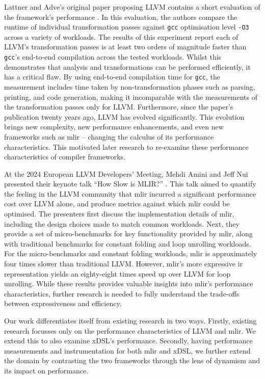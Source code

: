 Lattner and Adve's original paper proposing LLVM contains a short evaluation of the framework's performance \cite[Section 4.1.4]{lattnerLLVMCompilationFramework2004}.
In this evaluation, the authors compare the runtime of individual transformation passes against \texttt{gcc} optimisation level \texttt{-O3} across a variety of workloads.
The results of this experiment \cite[Table 2]{lattnerLLVMCompilationFramework2004} report each of LLVM's transformation passes is at least two orders of magnitude faster than \texttt{gcc}'s end-to-end compilation across the tested workloads. Whilst this demonstrates that analysis and transformations can be performed efficiently, it has a critical flaw. By using end-to-end compilation time for \texttt{gcc}, the measurement includes time taken by non-transformation phases such as parsing, printing, and code generation, making it incomparable with the measurements of the transformation passes only for LLVM.
Furthermore, since the paper's publication twenty years ago, LLVM has evolved significantly. This evolution brings new complexity, new performance enhancements, and even new frameworks such as \ac{mlir} -- changing the calculus of its performance characteristics.
This motivated later research to re-examine these performance characteristics of compiler frameworks.

At the 2024 European LLVM Developers' Meeting, Mehdi Amini and Jeff Nui presented their keynote talk ``How Slow is MLIR?'' \cite{aminiHowSlowMLIR2024}.
This talk aimed to quantify the feeling in the LLVM community that \ac{mlir} incurred a significant performance cost over LLVM alone, and produce metrics against which \ac{mlir} could be optimised.
The presenters first discuss the implementation details of \ac{mlir}, including the design choices made to match common workloads.
Next, they provide a set of micro-benchmarks for key functionality provided by \ac{mlir}, along with traditional benchmarks for constant folding and loop unrolling workloads. For the micro-benchmarks and constant folding workloads, \ac{mlir} is approximately four times slower than traditional LLVM. However, \ac{mlir}'s more expressive \ac{ir} representation yields an eighty-eight times speed up over LLVM for loop unrolling.
While these results provides valuable insights into \ac{mlir}'s performance characteristics, further research is needed to fully understand the trade-offs between expressiveness and efficiency.


Our work differentiates itself from existing research in two ways.
Firstly, existing research focusses only on the performance characteristics of LLVM and \ac{mlir}. We extend this to also examine xDSL's performance.
Secondly, having performance measurements and instrumentation for both \ac{mlir} and xDSL, we further extend the domain by contrasting the two frameworks through the lens of dynamism and its impact on performance.






